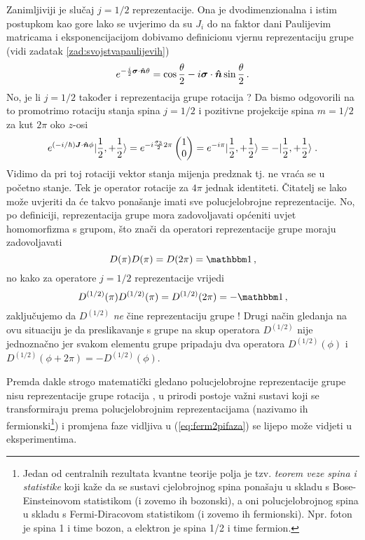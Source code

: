Zanimljiviji je slučaj $j=1/2$ reprezentacije. Ona je dvodimenzionalna i
istim postupkom kao gore lako se uvjerimo da su $J_i$ do na faktor
dani Paulijevim matricama i eksponencijacijom dobivamo definicionu
vjernu reprezentaciju grupe  (vidi zadatak  \ref{zad:svojstvapaulijevih})
\begin{equation}
 e^{-\frac{i}{2}\vec{\sigma}\cdot\unitn \theta} =
\cos \frac{\theta}{2}-i\vec{\sigma}\cdot\unitn \sin\frac{\theta}{2} \,.
\end{equation}
No, je li $j=1/2$ također i reprezentacija grupe rotacija ?
Da bismo odgovorili na to promotrimo rotaciju 
stanja spina $j=1/2$ i pozitivne projekcije spina $m=1/2$ za 
kut $2\pi$ oko $z$-osi
\begin{equation}
    e^{(-i/\hbar)\vec{J}\cdot\unitn\phi}\ket{\frac{1}{2}, +\frac{1}{2}} =
    e^{-i\frac{\sigma_3}{2} 2 \pi} \begin{pmatrix} 1 \\ 0 \end{pmatrix} =
    e^{-i \pi}\ket{\frac{1}{2}, +\frac{1}{2}} =
    -\ket{\frac{1}{2}, +\frac{1}{2}} \;.
    \label{eq:ferm2pifaza}
\end{equation}
Vidimo da pri toj rotaciji vektor stanja mijenja predznak tj. ne vraća se u početno stanje.
Tek je operator rotacije za $4\pi$ jednak identiteti.  Čitatelj
se lako može uvjeriti da će takvo ponašanje imati sve polucjelobrojne
reprezentacije.
No, po definiciji, reprezentacija grupe  mora zadovoljavati
općeniti uvjet homomorfizma s grupom, što znači da operatori
reprezentacije grupe  moraju zadovoljavati
\begin{equation}
    D(\pi)D(\pi)=D(2\pi)=\Eins \,,
\end{equation}
no kako za operatore $j=1/2$ reprezentacije vrijedi
\begin{equation}
    D^{(1/2)}(\pi)D^{(1/2)}(\pi)=D^{(1/2)}(2\pi)=-\Eins \,,
\end{equation}
zaključujemo da $D^{(1/2)}$
\emph{ne} čine reprezentaciju grupe ! Drugi način gledanja
na ovu situaciju je da preslikavanje s grupe  na
skup operatora  $D^{(1/2)}$ nije jednoznačno jer svakom elementu
grupe pripadaju dva operatora $D^{(1/2)}(\phi)$ i 
$D^{(1/2)}(\phi + 2\pi) = -D^{(1/2)}(\phi)$.

Premda dakle strogo matematički gledano polucjelobrojne reprezentacije
grupe  nisu reprezentacije grupe rotacija , u prirodi
postoje važni sustavi koji se transformiraju prema polucjelobrojnim
reprezentacijama (nazivamo ih fermionski\footnote{%
Jedan od centralnih rezultata kvantne teorije polja je tzv.
\emph{teorem  veze spina i statistike} koji kaže da se sustavi
cjelobrojnog spina ponašaju u skladu s Bose-Einsteinovom
statistikom (i zovemo ih bozonski), a oni polucjelobrojnog spina
u skladu s Fermi-Diracovom statistikom (i zovemo ih fermionski).
Npr. foton je spina 1 i time bozon, a elektron je spina 1/2 i time fermion.})
 i promjena faze vidljiva u (\ref{eq:ferm2pifaza})
se lijepo može vidjeti u eksperimentima.

